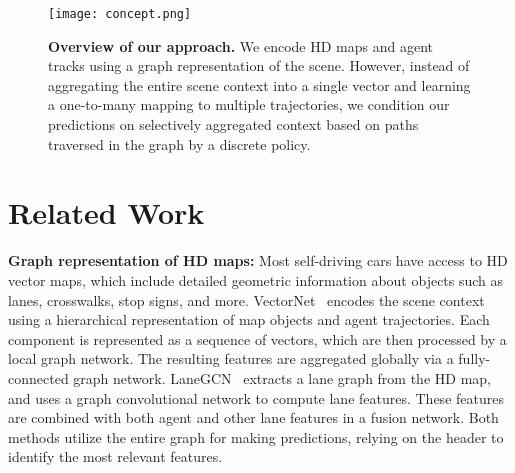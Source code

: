 \documentclass{article}
\begin{document}
\begin{figure}[t]
\texttt{[image: concept.png]}

\caption{\textbf{Overview of our approach.} We encode HD maps and agent tracks using a graph representation of the scene. However, instead of aggregating the entire scene context into a single vector and learning a one-to-many mapping to multiple trajectories, we condition our predictions on selectively aggregated context based on paths traversed in the graph by a discrete policy.}
\label{fig:concept}
\end{figure}



















\vspace{-2mm}
\section{Related Work}
\label{sec:related_work}
\vspace{-2mm}


\textbf{Graph representation of HD maps:} Most self-driving cars have access to HD vector maps, which include detailed geometric information about objects such as lanes, crosswalks, stop signs, and more.
VectorNet~\citep{gao2020vectornet} encodes the scene context using a hierarchical representation of map objects and agent trajectories. 
Each component is represented as a sequence of vectors, which are then processed by a local graph network. 
The resulting features are aggregated globally via a fully-connected graph network. LaneGCN~\citep{liang2020laneGcn} extracts a lane graph from the HD map, and uses a graph convolutional network to compute lane features.
These features are combined with both agent and other lane features in a fusion network.
Both methods utilize the entire graph for making predictions, relying on the header to identify the most relevant features.
\end{document}
